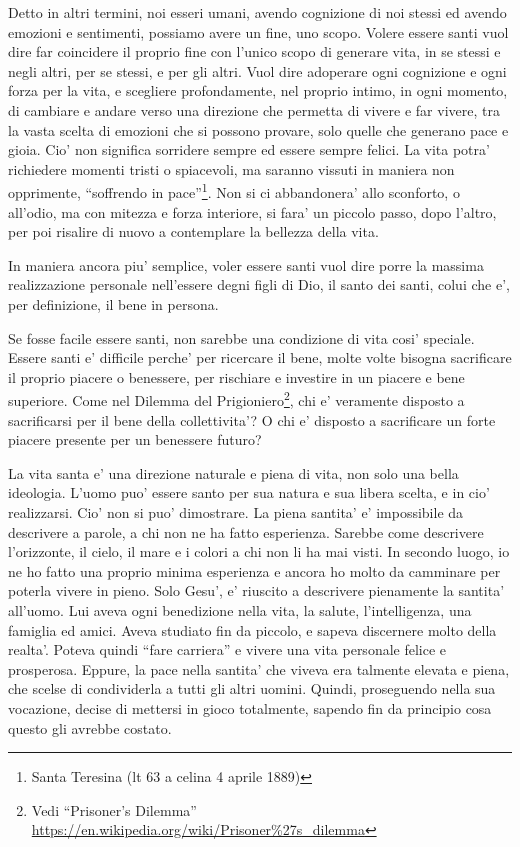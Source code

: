 Detto in altri termini, noi esseri umani, avendo cognizione di noi stessi ed avendo emozioni e sentimenti, possiamo avere un fine, uno scopo. Volere essere santi vuol dire far coincidere il proprio fine con l'unico scopo di generare vita, in se stessi e negli altri, per se stessi, e per gli altri. Vuol dire adoperare ogni cognizione e ogni forza per la vita, e scegliere profondamente, nel proprio intimo, in ogni momento, di cambiare e andare verso una direzione che permetta di vivere e far vivere, tra la vasta scelta di emozioni che si possono provare, solo quelle che generano pace e gioia. Cio' non significa sorridere sempre ed essere sempre felici. La vita potra' richiedere momenti tristi o spiacevoli, ma saranno vissuti in maniera non opprimente, ``soffrendo in pace''\footnote{Santa Teresina (lt 63 a celina 4 aprile 1889)}. Non si ci abbandonera' allo sconforto, o all'odio, ma con mitezza e forza interiore, si fara' un piccolo passo, dopo l'altro, per poi risalire di nuovo a contemplare la bellezza della vita. 

In maniera ancora piu' semplice, voler essere santi vuol dire porre la massima realizzazione personale nell'essere degni figli di Dio, il santo dei santi, colui che e', per definizione, il bene in persona.


Se fosse facile essere santi, non sarebbe una condizione di vita cosi' speciale. Essere santi e' difficile perche' per ricercare il bene, molte volte bisogna sacrificare il proprio piacere o benessere, per rischiare e investire in un piacere e bene superiore. Come nel Dilemma del Prigioniero\footnote{Vedi ``Prisoner's Dilemma'' \url{https://en.wikipedia.org/wiki/Prisoner\%27s\_dilemma}}, chi e' veramente disposto a sacrificarsi per il bene della collettivita'? O chi e' disposto a sacrificare un forte piacere presente per un benessere futuro?

La vita santa e' una direzione naturale e piena di vita, non solo una bella ideologia. L'uomo puo' essere santo per sua natura e sua libera scelta, e in cio' realizzarsi. Cio' non si puo' dimostrare.  La piena santita' e' impossibile da descrivere a parole, a chi non ne ha fatto esperienza. Sarebbe come descrivere l'orizzonte, il cielo, il mare e i colori a chi non li ha mai visti. In secondo luogo, io ne ho fatto una proprio minima esperienza e ancora ho molto da camminare per poterla vivere in pieno. Solo Gesu', e' riuscito a descrivere pienamente la santita' all'uomo. Lui aveva ogni benedizione nella vita, la salute, l'intelligenza, una famiglia ed amici. Aveva studiato fin da piccolo, e sapeva discernere molto della realta'. Poteva quindi ``fare carriera'' e vivere una vita personale felice e prosperosa. Eppure, la pace nella santita' che viveva era talmente elevata e piena, che scelse di condividerla a tutti gli altri uomini. Quindi, proseguendo nella sua vocazione, decise di mettersi in gioco totalmente, sapendo fin da principio cosa questo gli avrebbe costato.


